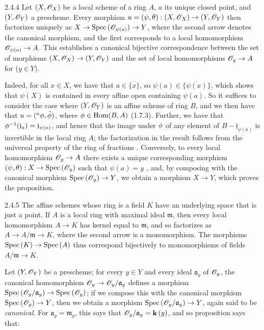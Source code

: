 \begin{envs}[Proposition]{2.4.4}
\label{prop-1.2.4.4}
Let $(X,\mathscr{O}_X)$ be a local scheme of a ring
$A$, $a$ its unique closed point, and $(Y,\mathscr{O}_Y)$ a prescheme.  Every morphism
$u=(\psi,\theta):(X,\mathscr{O}_X)\to(Y,\mathscr{O}_Y)$ then factorizes uniquely as
$X\to{\mathop{\mathrm{Spec}}\nolimits}\,(\mathscr{O}_{\psi(a)})\to Y$, where the second arrow denotes the canonical
morphism, and the first corresponds to a local homomorphism $\mathscr{O}_{\psi(a)}\to A$.
This establishes a canonical bijective correspondence between the set of
morphisms $(X,\mathscr{O}_X)\to(Y,\mathscr{O}_Y)$ and the set of local homomorphisms $\mathscr{O}_y\to A$
for ($y\in Y$).
\end{envs}
    
Indeed, for all $x\in X$, we have that $a\in\overline{\{x\}}$, so
$\psi(a)\in\overline{\{\psi(x)\}}$, which shows that $\psi(X)$ is contained in
every affine open containing $\psi(a)$. So it suffices to consider the case
where $(Y,\mathscr{O}_Y)$ is an affine scheme of ring $B$, and we then have that
$u=({}^a\phi,\tilde{\phi})$, where $\phi\in{\mathop{\mathrm{Hom}}\nolimits}(B,A)$ (1.7.3).  Further,
we have that $\phi^{-1}(\mathfrak{j}_a)=\mathfrak{j}_{\psi(a)}$, and hence
that the image under $\phi$ of any element of
$B-\mathfrak{j}_{\psi(a)}$ is invertible in the local ring $A$; the
factorization in the result follows from the universal property of the ring of
fractions . Conversely, to every local homomorphism
$\mathscr{O}_y\to A$ there exists a unique corresponding morphism
$(\psi,\theta):X\to{\mathop{\mathrm{Spec}}\nolimits}\,(\mathscr{O}_y)$ such that $\psi(a)=y$ , and,
by composing with the canonical morphism ${\mathop{\mathrm{Spec}}\nolimits}\,(\mathscr{O}_y)\to Y$, we obtain a morphism
$X\to Y$, which proves the proposition.
    
\begin{env}{2.4.5}
\label{env-1.2.4.5}
The affine schemes whose ring is a field $K$ have an
underlying space that is just a point. If $A$ is a local ring with maximal
ideal $\mathfrak{m}$, then every local homomorphism $A\to K$ has kernel equal to
$\mathfrak{m}$, and so factorizes as $A\to A/\mathfrak{m}\to K$, where the
second arrow is a monomorphism. The morphisms ${\mathop{\mathrm{Spec}}\nolimits}\,(K)\to{\mathop{\mathrm{Spec}}\nolimits}\,(A)$ thus
correspond bijectively to monomorphisms of fields $A/\mathfrak{m}\to K$.
\end{env}
    
Let $(Y,\mathscr{O}_Y)$ be a prescheme; for every $y\in Y$ and every ideal
$\mathfrak{a}_y$ of $\mathscr{O}_y$, the canonical homomorphism
$\mathscr{O}_y\to\mathscr{O}_y/\mathfrak{a}_y$ defines a morphism
${\mathop{\mathrm{Spec}}\nolimits}\,(\mathscr{O}_y/\mathfrak{a}_y)\to{\mathop{\mathrm{Spec}}\nolimits}\,(\mathscr{O}_y)$; if we compose this with the
canonical morphism ${\mathop{\mathrm{Spec}}\nolimits}\,(\mathscr{O}_y)\to Y$, then we obtain a morphism
${\mathop{\mathrm{Spec}}\nolimits}\,(\mathscr{O}_y/\mathfrak{a}_y)\to Y$, again said to be \textit{canonical}. For
$\mathfrak{a}_y=\mathfrak{m}_y$, this says that $\mathscr{O}_y/\mathfrak{a}_y=\mathbf{k}\,(y)$, and
so proposition  says that:
    
